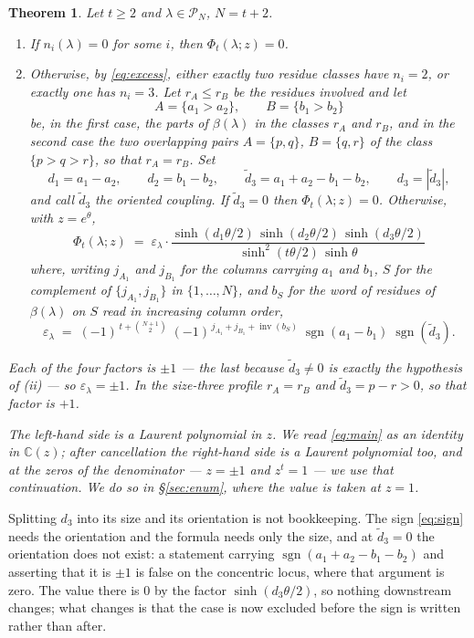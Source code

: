 \documentclass[11pt,reqno]{amsart}
\theoremstyle{plain}
\newtheorem{theorem}{Theorem}[section]
\theoremstyle{definition}
\newcommand{\CC}{\mathbb{C}}
\newcommand{\PP}{\mathcal{P}}
\newcommand{\inv}{\operatorname{inv}}
\newcommand{\sgn}{\operatorname{sgn}}
\begin{document}
\begin{theorem}\label{thm:main}
Let $t\ge2$ and $\lambda\in\PP_N$, $N=t+2$.
\begin{enumerate}
\item[\rm(i)] If $n_i(\lambda)=0$ for some $i$, then $\Phi_t(\lambda;z)=0$.
\item[\rm(ii)] Otherwise, by \eqref{eq:excess}, either exactly two residue classes have $n_i=2$, or
exactly one has $n_i=3$. Let $r_A\le r_B$ be the residues involved and let
\[
A=\{a_1>a_2\},\qquad B=\{b_1>b_2\}
\]
be, in the first case, the parts of $\beta(\lambda)$ in the classes $r_A$ and $r_B$, and in the
second case the two overlapping pairs $A=\{p,q\}$, $B=\{q,r\}$ of the class $\{p>q>r\}$, so that
$r_A=r_B$. Set
\[
d_1=a_1-a_2,\qquad d_2=b_1-b_2,\qquad
\tilde d_3=a_1+a_2-b_1-b_2,\qquad d_3=|\tilde d_3| ,
\]
and call $\tilde d_3$ the \emph{oriented coupling}. If $\tilde d_3=0$ then $\Phi_t(\lambda;z)=0$.
Otherwise, with $z=e^\theta$,
\begin{equation}\label{eq:main}
\boxed{\;\;\Phi_t(\lambda;z)\;=\;\varepsilon_\lambda\cdot
\frac{\sinh(d_1\theta/2)\,\sinh(d_2\theta/2)\,\sinh(d_3\theta/2)}
{\sinh^2(t\theta/2)\,\sinh\theta}\;\;}
\end{equation}
where, writing $j_{A_1}$ and $j_{B_1}$ for the columns carrying $a_1$ and $b_1$, $S$ for the
complement of $\{j_{A_1},j_{B_1}\}$ in $\{1,\dots,N\}$, and $b_S$ for the word of residues of
$\beta(\lambda)$ on $S$ read in increasing column order,
\begin{equation}\label{eq:sign}
\varepsilon_\lambda\;=\;(-1)^{\,t+\binom{N+1}{2}}\;
(-1)^{\,j_{A_1}+j_{B_1}+\inv(b_S)}\;\sgn(a_1-b_1)\;\sgn(\tilde d_3).
\end{equation}
\end{enumerate}
Each of the four factors is $\pm1$ --- the last because $\tilde d_3\ne0$ is exactly the hypothesis
of {\rm(ii)} --- so $\varepsilon_\lambda=\pm1$. In the size-three profile $r_A=r_B$ and
$\tilde d_3=p-r>0$, so that factor is $+1$.

The left-hand side is a Laurent polynomial in $z$. We read \eqref{eq:main} as an identity in
$\CC(z)$; after cancellation the right-hand side is a Laurent polynomial too, and at the zeros of
the denominator --- $z=\pm1$ and $z^t=1$ --- we use that continuation. We do so in
\S\ref{sec:enum}, where the value is taken at $z=1$.
\end{theorem}

\noindent Splitting $d_3$ into its size and its orientation is not bookkeeping. The sign
\eqref{eq:sign} needs the orientation and the formula needs only the size, and at $\tilde d_3=0$ the
orientation does not exist: a statement carrying $\sgn(a_1+a_2-b_1-b_2)$ and asserting that it is
$\pm1$ is false on the concentric locus, where that argument is zero. The value there is $0$ by the
factor $\sinh(d_3\theta/2)$, so nothing downstream changes; what changes is that the case is now
excluded before the sign is written rather than after.
\end{document}
